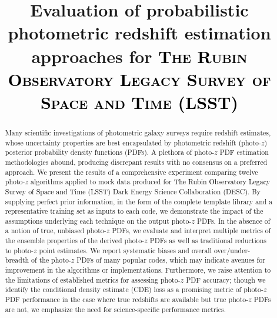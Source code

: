 \documentclass[\docopts]{\docclass}
\newcommand{\boldblue}[1]{{ \textcolor{black}{#1}}}
\newcommand{\xsout}[1]{}
\begin{document}

\title[Photo-z estimation approaches for LSST]{Evaluation of probabilistic photometric redshift estimation approaches for \boldblue{ \textsc{The Rubin Observatory Legacy Survey of Space and Time} (LSST)}}

\maketitlepre

\begin{abstract}

Many scientific investigations of photometric galaxy surveys require redshift estimates, whose uncertainty properties are best encapsulated by photometric redshift (photo-$z$) posterior probability density functions (PDFs).
A plethora of photo-$z$ PDF estimation methodologies abound, producing discrepant results with no consensus on a preferred approach.
We present the results of a comprehensive experiment comparing twelve photo-$z$ algorithms applied to mock data produced for\xsout{Large Synoptic Survey Telescope} \boldblue{The Rubin Observatory Legacy Survey of Space and Time} (\textsc{LSST}) Dark Energy Science Collaboration (\textsc{DESC}).
By supplying perfect prior information, in the form of the complete template library and a representative training set as inputs to each code, we demonstrate the impact of the assumptions underlying each technique on the output photo-$z$ PDFs.
In the absence of a notion of true, unbiased photo-$z$ PDFs, we evaluate and interpret multiple metrics of the ensemble properties of the derived photo-$z$ PDFs as well as traditional reductions to photo-$z$ point estimates.
We report systematic biases and overall over/under-breadth of the photo-$z$ PDFs of many popular codes, which may indicate avenues for improvement in the algorithms or implementations.
Furthermore, we raise attention to the limitations of established metrics for assessing photo-$z$ PDF accuracy; though we identify the conditional density estimate (CDE) loss as a promising metric of photo-$z$ PDF performance in the case where true redshifts are available but true photo-$z$ PDFs are not, we emphasize the need for science-specific performance metrics.

\end{abstract}


\maketitlepost

\end{document}
